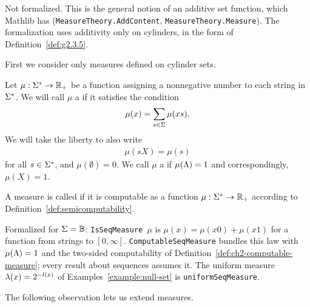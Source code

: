 \begin{formalization}
Not formalized. This is the general notion of an additive set function, which Mathlib has
(\texttt{MeasureTheory.AddContent}, \texttt{MeasureTheory.Measure}). The formalization uses
additivity only on cylinders, in the form of Definition~\ref{def:g2.3.5}.
\end{formalization}

First we consider only measures defined on cylinder sets.

\begin{definition}
  \label{def:g2.3.5}
  \leanok
Let \( \mu:\Sigma^{*}\to\mathbb{R}_{+} \) be a function assigning a nonnegative number to
each string in \( \Sigma^{*} \).
We will call \( \mu \) a  if it satisfies the condition
 \begin{align}\label{eq:extension-sum}
   \mu(x)=\sum_{s\in\Sigma}\mu(xs).
 \end{align}
We will take the liberty to also write
 \begin{align*}
   \mu(s X)=\mu(s)
 \end{align*}
for all \( s\in\Sigma^{*} \), and \( \mu(\emptyset)=0 \).
We call \( \mu \) a  if \( \mu(\Lambda)=1 \) and correspondingly,
\( \mu(X)=1 \).

A measure is called  if it is computable as a function
\( \mu:\Sigma^{*}\to\mathbb{R}_{+} \) according to Definition~\ref{def:semicomputability}.
\end{definition}

\begin{formalization}
Formalized for \( \Sigma = \mathbb{B} \): \texttt{IsSeqMeasure \( \mu \)} is
\( \mu(x) = \mu(x0) + \mu(x1) \) for a function from strings to \( [0,\infty] \).
\texttt{ComputableSeqMeasure} bundles this law with \( \mu(\Lambda) = 1 \) and the two-sided
computability of Definition~\ref{def:ch2-computable-measure}; every result about sequences
assumes it. The uniform measure \( \lambda(x) = 2^{-l(x)} \) of
Examples~\ref{example:null-set} is \texttt{uniformSeqMeasure}.
\end{formalization}

The following observation lets us extend measures.

